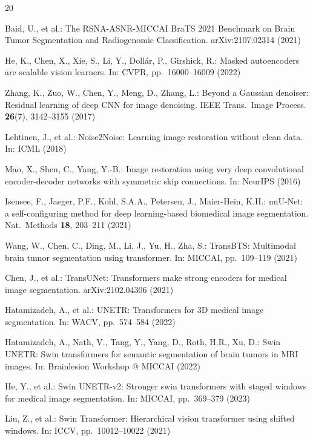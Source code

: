 \documentclass[runningheads]{llncs}
\begin{document}

\begin{thebibliography}{20}

Baid, U., et al.: The RSNA-ASNR-MICCAI BraTS 2021 Benchmark on Brain Tumor
Segmentation and Radiogenomic Classification. arXiv:2107.02314 (2021)

He, K., Chen, X., Xie, S., Li, Y., Doll{\'a}r, P., Girshick, R.:
Masked autoencoders are scalable vision learners.
In: CVPR, pp.~16000–16009 (2022)

Zhang, K., Zuo, W., Chen, Y., Meng, D., Zhang, L.:
Beyond a Gaussian denoiser: Residual learning of deep CNN for image denoising.
IEEE Trans.\ Image Process. \textbf{26}(7), 3142–3155 (2017)

Lehtinen, J., et al.: Noise2Noise: Learning image restoration without clean data.
In: ICML (2018)

Mao, X., Shen, C., Yang, Y.-B.:
Image restoration using very deep convolutional encoder-decoder networks
with symmetric skip connections.
In: NeurIPS (2016)

Isensee, F., Jaeger, P.F., Kohl, S.A.A., Petersen, J., Maier-Hein, K.H.:
nnU-Net: a self-configuring method for deep learning-based biomedical image segmentation.
Nat.\ Methods \textbf{18}, 203–211 (2021)

Wang, W., Chen, C., Ding, M., Li, J., Yu, H., Zha, S.:
TransBTS: Multimodal brain tumor segmentation using transformer.
In: MICCAI, pp.~109–119 (2021)

Chen, J., et al.: TransUNet: Transformers make strong encoders for medical image segmentation.
arXiv:2102.04306 (2021)

Hatamizadeh, A., et al.: UNETR: Transformers for 3D medical image segmentation.
In: WACV, pp.~574–584 (2022)

Hatamizadeh, A., Nath, V., Tang, Y., Yang, D., Roth, H.R., Xu, D.:
Swin UNETR: Swin transformers for semantic segmentation of brain tumors in MRI images.
In: Brainlesion Workshop @ MICCAI (2022)

He, Y., et al.: Swin UNETR-v2: Stronger swin transformers with staged windows
for medical image segmentation.
In: MICCAI, pp.~369–379 (2023)

Liu, Z., et al.: Swin Transformer: Hierarchical vision transformer using shifted windows.
In: ICCV, pp.~10012–10022 (2021)


\end{thebibliography}
\end{document}
